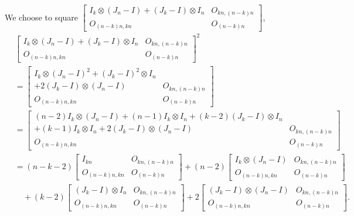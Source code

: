 We choose to square $\begin{bmatrix}
        I_k\otimes(J_n-I) + (J_k-I) \otimes I_n & O_{kn, (n-k)n} \\
        O_{(n-k)n,kn} & O_{(n-k)n}
    \end{bmatrix}$,
\begin{align*}
    &\begin{bmatrix}
        I_k\otimes(J_n-I) + (J_k-I) \otimes I_n & O_{kn, (n-k)n} \\
        O_{(n-k)n,kn} & O_{(n-k)n}
    \end{bmatrix}^2\\
    &= \begin{bmatrix}
        I_k\otimes(J_n-I)^2 + (J_k-I)^2 \otimes I_n & \\
        +2(J_k-I)\otimes(J_n-I)&O_{kn, (n-k)n} \\
        O_{(n-k)n,kn} & O_{(n-k)n}
    \end{bmatrix}\\
    &= \begin{bmatrix}
        (n-2)I_k\otimes(J_n-I) + (n-1)I_k\otimes I_n + (k-2)(J_k-I) \otimes I_n  & \\
        + (k-1)I_k\otimes I_n +2(J_k-I)\otimes(J_n-I)&O_{kn, (n-k)n} \\
        O_{(n-k)n,kn} & O_{(n-k)n}
    \end{bmatrix}\\
    &= (n-k-2)\begin{bmatrix}
        I_{kn} & O_{kn, (n-k)n} \\
        O_{(n-k)n,kn} & O_{(n-k)n}
    \end{bmatrix} + (n-2)\begin{bmatrix}
        I_k\otimes(J_n-I) & O_{kn, (n-k)n} \\
        O_{(n-k)n,kn} & O_{(n-k)n}
    \end{bmatrix}\\
    &\quad + (k-2)\begin{bmatrix}
        (J_k-I) \otimes I_n & O_{kn, (n-k)n} \\
        O_{(n-k)n,kn} & O_{(n-k)n}
    \end{bmatrix} + 2\begin{bmatrix}
        (J_k-I)\otimes(J_n-I) & O_{kn, (n-k)n} \\
        O_{(n-k)n,kn} & O_{(n-k)n}
    \end{bmatrix}.
\end{align*}

